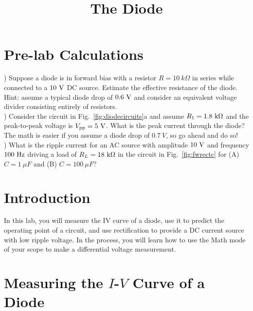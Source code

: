 \documentclass[12pt]{article}
\begin{document}

\title{The Diode}

\maketitle

\section{Pre-lab Calculations}
) Suppose a diode is in forward bias with a resistor $R=10~k\Omega$ in series while connected to a $10~\rm V$ DC source.  Estimate the effective resistance of the diode.  Hint: assume a typical diode drop of $0.6~\rm V$ and consider an equivalent voltage divider consisting entirely of resistors. \\ 

) Consider the circuit in Fig.~\ref{fig:diodecircuits}a and assume $R_1=1.8~\rm k \Omega$ and the peak-to-peak voltage is $V_{\rm pp} = 5~\rm V$.  What is the peak current through the diode?  The math is easier if you assume a diode drop of $0.7~V$, so go ahead and do so! \\

) What is the ripple current for an AC source with amplitude $10~\rm V$ and frequency $100~\rm Hz$ driving a load of $R_L=18~\rm k\Omega$ in the circuit in Fig.~\ref{fig:fwrectc} for (A) $C=1~\mu F$ and (B) $C=100~\mu F$?

\section{Introduction}

In this lab, you will measure the IV curve of a diode, use it to predict the operating point of a circuit, and use rectification to provide a DC current source with low ripple voltage.   In the process, you will learn how to use the Math mode of your scope to make a differential voltage measurement.

\section{Measuring the $I$-$V$ Curve of a Diode}
\end{document}
